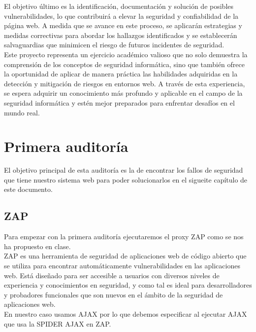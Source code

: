 \documentclass{report}
\begin{document}
        El objetivo último es la identificación, documentación y solución de posibles vulnerabilidades, lo que contribuirá a elevar la seguridad y confiabilidad de la página web. A medida que se avance en este proceso, se aplicarán estrategias y medidas correctivas para abordar los hallazgos identificados y se establecerán salvaguardias que minimicen el riesgo de futuros incidentes de seguridad.\\
        
        Este proyecto representa un ejercicio académico valioso que no solo demuestra la comprensión de los conceptos de seguridad informática, sino que también ofrece la oportunidad de aplicar de manera práctica las habilidades adquiridas en la detección y mitigación de riesgos en entornos web. A través de esta experiencia, se espera adquirir un conocimiento más profundo y aplicable en el campo de la seguridad informática y estén mejor preparados para enfrentar desafíos en el mundo real.\\
    \chapter{Primera auditoría}
        El objetivo principal de esta auditoría es la de encontrar los fallos de seguridad que tiene nuestro sistema web para poder solucionarlos en el sigueite capítulo de este documento.
        \section{ZAP}
            Para empezar con la primera auditoría ejecutaremos el proxy ZAP como se nos ha propuesto en clase.\\
            
            ZAP es una herramienta de seguridad de aplicaciones web de código abierto que se utiliza para encontrar automáticamente vulnerabilidades en las aplicaciones web. Está diseñado para ser accesible a usuarios con diversos niveles de experiencia y conocimientos en seguridad, y como tal es ideal para desarrolladores y probadores funcionales que son nuevos en el ámbito de la seguridad de aplicaciones web.\\
            
            En nuestro caso usamos AJAX por lo que debemos especificar al ejecutar AJAX que usa la SPIDER AJAX en ZAP.\\
            
\end{document}
